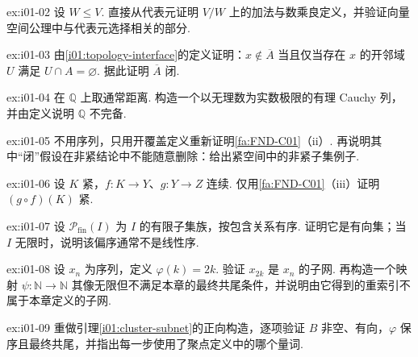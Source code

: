 \begin{FAExercise}[商向量空间的良定义]{ex:i01-02}
设 \(\displaystyle W\leqslant V\). 直接从代表元证明 \(\displaystyle V/W\) 上的加法与数乘良定义，并验证向量空间公理中与代表元选择相关的部分.
\end{FAExercise}

\begin{FAExercise}[闭包的邻域刻画]{ex:i01-03}
由\autoref{i01:topology-interface}的定义证明：\(\displaystyle x\notin\overline A\) 当且仅当存在 \(\displaystyle x\) 的开邻域 \(\displaystyle U\) 满足 \(\displaystyle U\cap A=\varnothing\). 据此证明 \(\displaystyle \overline A\) 闭.
\end{FAExercise}

\begin{FAExercise}[完备性的反例]{ex:i01-04}
在 \(\displaystyle \mathbb Q\) 上取通常距离. 构造一个以无理数为实数极限的有理 Cauchy 列，并由定义说明 \(\displaystyle \mathbb Q\) 不完备.
\end{FAExercise}

\begin{FAExercise}[闭子集紧性]{ex:i01-05}
不用序列，只用开覆盖定义重新证明\autoref{fa:FND-C01}（ii）. 再说明其中“闭”假设在非紧结论中不能随意删除：给出紧空间中的非紧子集例子.
\end{FAExercise}

\begin{FAExercise}[连续像与复合]{ex:i01-06}
设 \(\displaystyle K\) 紧，\(\displaystyle f:K\to Y\)、\(\displaystyle g:Y\to Z\) 连续. 仅用\autoref{fa:FND-C01}（iii）证明 \(\displaystyle (g\circ f)(K)\) 紧.
\end{FAExercise}

\begin{FAExercise}[有向集不必线性有序]{ex:i01-07}
设 \(\displaystyle \mathcal P_{\mathrm{fin}}(I)\) 为 \(\displaystyle I\) 的有限子集族，按包含关系有序. 证明它是有向集；当 \(\displaystyle I\) 无限时，说明该偏序通常不是线性序.
\end{FAExercise}

\begin{FAExercise}[验证一个子网]{ex:i01-08}
设 \(\displaystyle x_n\) 为序列，定义 \(\displaystyle \varphi(k)=2k\). 验证 \(\displaystyle x_{2k}\) 是 \(\displaystyle x_n\) 的子网. 再构造一个映射 \(\displaystyle \psi:\mathbb N\to\mathbb N\) 其像无限但不满足本章的最终共尾条件，并说明由它得到的重索引不属于本章定义的子网.
\end{FAExercise}

\begin{FAExercise}[聚点三元组构造]{ex:i01-09}
重做引理\ref{i01:cluster-subnet}的正向构造，逐项验证 \(\displaystyle B\) 非空、有向，\(\displaystyle \varphi\) 保序且最终共尾，并指出每一步使用了聚点定义中的哪个量词.
\end{FAExercise}

